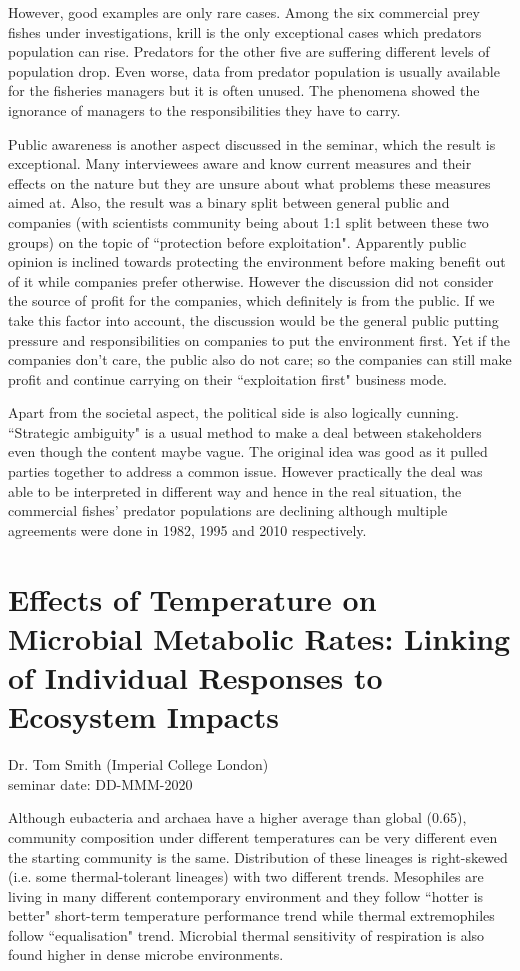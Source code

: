 \documentclass{article}
\begin{document}
    However, good examples are only rare cases.  Among the six commercial prey fishes under investigations, krill is the only exceptional cases which predators population can rise.  Predators for the other five are suffering different levels of population drop.  Even worse, data from predator population is usually available for the fisheries managers but it is often unused.  The phenomena showed the ignorance of managers to the responsibilities they have to carry.
    
    Public awareness is another aspect discussed in the seminar, which the result is exceptional.  Many interviewees aware and know current measures and their effects on the nature but they are unsure about what problems these measures aimed at.  Also, the result was a binary split between general public and companies (with scientists community being about 1:1 split between these two groups) on the topic of ``protection before exploitation".  Apparently public opinion is inclined towards protecting the environment before making benefit out of it while companies prefer otherwise.  However the discussion did not consider the source of profit for the companies, which definitely is from the public.  If we take this factor into account, the discussion would be the general public putting pressure and responsibilities on companies to put the environment first.  Yet if the companies don't care, the public also do not care; so the companies can still make profit and continue carrying on their ``exploitation first" business mode.
    
    Apart from the societal aspect, the political side is also logically cunning.  ``Strategic ambiguity" is a usual method to make a deal between stakeholders even though the content maybe vague.  The original idea was good as it pulled parties together to address a common issue.  However practically the deal was able to be interpreted in different way and hence in the real situation, the commercial fishes' predator populations are declining although multiple agreements were done in 1982, 1995 and 2010 respectively.
    \clearpage
    
    \section{Effects of Temperature on Microbial Metabolic Rates: Linking of Individual Responses to Ecosystem Impacts}
    \begin{flushright}
        \large{Dr. Tom Smith (Imperial College London)}\\
        seminar date: DD-MMM-2020
    \end{flushright}
    Although eubacteria and archaea have a higher average than global (0.65), community composition under different temperatures can be very different even the starting community is the same.  Distribution of these lineages is right-skewed (i.e. some thermal-tolerant lineages) with two different trends.  Mesophiles are living in many different contemporary environment and they follow ``hotter is better" short-term temperature performance trend while thermal extremophiles follow ``equalisation" trend.  Microbial thermal sensitivity of respiration is also found higher in dense microbe environments.
    
\end{document}
